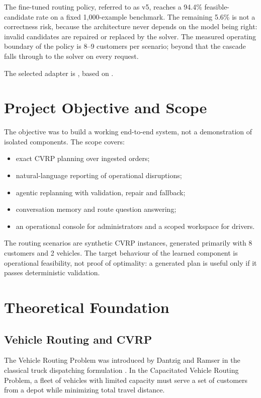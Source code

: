 \documentclass[11pt,a4paper]{article}
\begin{document}
The fine-tuned routing policy, referred to as v5, reaches a 94.4\% feasible-candidate rate on a fixed
1,000-example benchmark. The remaining 5.6\% is not a correctness risk, because the architecture
never depends on the model being right: invalid candidates are repaired or replaced by the solver.
The measured operating boundary of the policy is 8--9 customers per scenario; beyond that the
cascade falls through to the solver on every request.

The selected adapter is
, based on
.

\section{Project Objective and Scope}

The objective was to build a working end-to-end system, not a demonstration of isolated components.
The scope covers:

\begin{itemize}
  \item exact CVRP planning over ingested orders;
  \item natural-language reporting of operational disruptions;
  \item agentic replanning with validation, repair and fallback;
  \item conversation memory and route question answering;
  \item an operational console for administrators and a scoped workspace for drivers.
\end{itemize}

The routing scenarios are synthetic CVRP instances, generated primarily with 8 customers and 2
vehicles. The target behaviour of the learned component is operational feasibility, not proof of
optimality: a generated plan is useful only if it passes deterministic validation.

\section{Theoretical Foundation}

\subsection{Vehicle Routing and CVRP}

The Vehicle Routing Problem was introduced by Dantzig and Ramser in the classical truck dispatching
formulation \cite{dantzig1959}. In the Capacitated Vehicle Routing Problem, a fleet of vehicles with
limited capacity must serve a set of customers from a depot while minimizing total travel distance.
\end{document}
